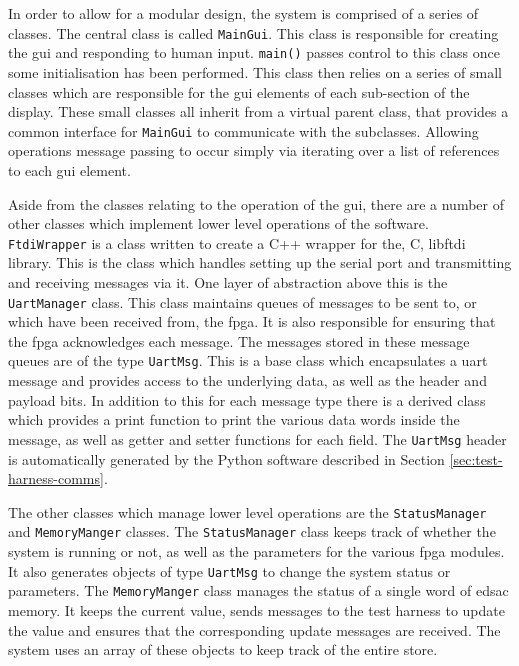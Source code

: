 In order to allow for a modular design, the system is comprised of a series of classes. The central class is called \texttt{MainGui}. This class is responsible for creating the \gls{gui} and responding to human input. \texttt{main()} passes control to this class once some initialisation has been performed. This class then relies on a series of small classes which are responsible for the \gls{gui} elements of each sub-section of the display. These small classes all inherit from a virtual parent class, that provides a common interface for \texttt{MainGui} to communicate with the subclasses. Allowing operations message passing to occur simply via iterating over a list of references to each \gls{gui} element.

Aside from the classes relating to the operation of the \gls{gui}, there are a number of other classes which implement lower level operations of the software. \texttt{FtdiWrapper} is a class written to create a C++ wrapper for the, C, libftdi library. This is the class which handles setting up the serial port and transmitting and receiving messages via it. One layer of abstraction above this is the \texttt{UartManager} class. This class maintains queues of messages to be sent to, or which have been received from, the \gls{fpga}. It is also responsible for ensuring that the \gls{fpga} acknowledges each message. The messages stored in these message queues are of the type \texttt{UartMsg}. This is a base class which encapsulates a \gls{uart} message and provides access to the underlying data, as well as the header and payload bits. In addition to this for each message type there is a derived class which provides a print function to print the various data words inside the message, as well as getter and setter functions for each field. The \texttt{UartMsg} header is automatically generated by the Python software described in Section \ref{sec:test-harness-comms}.

The other classes which manage lower level operations are the \texttt{StatusManager} and \texttt{MemoryManger} classes. The \texttt{StatusManager} class keeps track of whether the system is running or not, as well as the parameters for the various \gls{fpga} modules. It also generates objects of type \texttt{UartMsg} to change the system status or parameters. The \texttt{MemoryManger} class manages the status of a single word of \gls{edsac} memory. It keeps the current value, sends messages to the test harness to update the value and ensures that the corresponding update messages are received. The system uses an array of these objects to keep track of the entire store.

